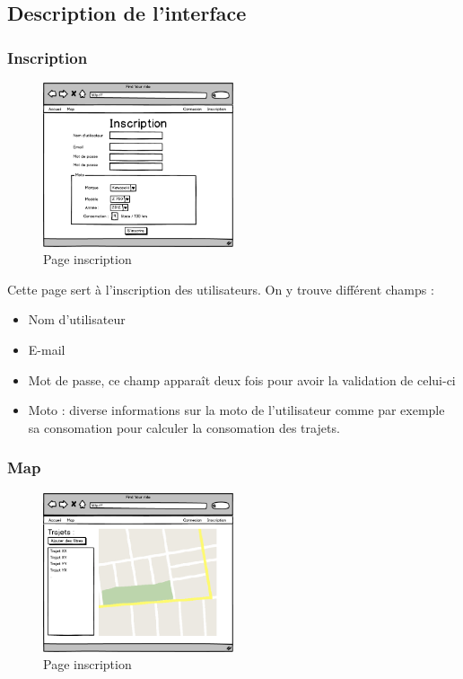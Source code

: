 \documentclass[a4paper]{article}
\begin{document}
\newpage

\subsection{Description de l'interface}

\subsubsection{Inscription}
\begin{figure}[h]
\centering
\includegraphics[width=0.5\textwidth]{./Images/Interfaces/inscription.png}
\caption{Page inscription}
\end{figure}

Cette page sert à l'inscription des utilisateurs. On y trouve différent champs : 
\begin{itemize}
    \item Nom d'utilisateur
    \item E-mail
    \item Mot de passe, ce champ apparaît deux fois pour avoir la validation de celui-ci
    \item Moto : diverse informations sur la moto de l'utilisateur comme par exemple sa consomation pour calculer la consomation des trajets.
\end{itemize}

\subsubsection{Map}
\begin{figure}[h]
\centering
\includegraphics[width=0.5\textwidth]{./Images/Interfaces/Map.png}
\caption{Page inscription}
\end{figure}
\end{document}
